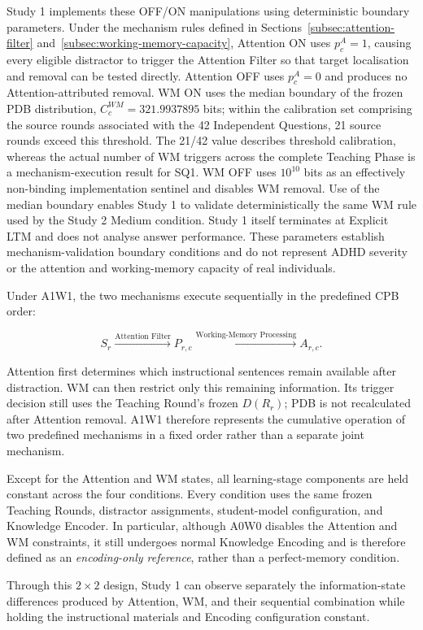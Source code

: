 Study 1 implements these OFF/ON manipulations using deterministic boundary parameters. Under the mechanism rules defined in Sections~\ref{subsec:attention-filter} and~\ref{subsec:working-memory-capacity}, Attention ON uses $p^A_c=1$, causing every eligible distractor to trigger the Attention Filter so that target localisation and removal can be tested directly. Attention OFF uses $p^A_c=0$ and produces no Attention-attributed removal. WM ON uses the median boundary of the frozen PDB distribution, $C^{WM}_c=321.9937895$ bits; within the calibration set comprising the source rounds associated with the 42 Independent Questions, 21 source rounds exceed this threshold. The 21/42 value describes threshold calibration, whereas the actual number of WM triggers across the complete Teaching Phase is a mechanism-execution result for SQ1. WM OFF uses $10^{10}$ bits as an effectively non-binding implementation sentinel and disables WM removal. Use of the median boundary enables Study 1 to validate deterministically the same WM rule used by the Study 2 Medium condition. Study 1 itself terminates at Explicit LTM and does not analyse answer performance. These parameters establish mechanism-validation boundary conditions and do not represent ADHD severity or the attention and working-memory capacity of real individuals.

Under A1W1, the two mechanisms execute sequentially in the predefined CPB order:

\[
S_r
\xrightarrow{\text{Attention Filter}}
P_{r,c}
\xrightarrow{\text{Working-Memory Processing}}
A_{r,c}.
\]

Attention first determines which instructional sentences remain available after distraction. WM can then restrict only this remaining information. Its trigger decision still uses the Teaching Round's frozen $D(R_r)$; PDB is not recalculated after Attention removal. A1W1 therefore represents the cumulative operation of two predefined mechanisms in a fixed order rather than a separate joint mechanism.

Except for the Attention and WM states, all learning-stage components are held constant across the four conditions. Every condition uses the same frozen Teaching Rounds, distractor assignments, student-model configuration, and Knowledge Encoder. In particular, although A0W0 disables the Attention and WM constraints, it still undergoes normal Knowledge Encoding and is therefore defined as an \textit{encoding-only reference}, rather than a perfect-memory condition.

Through this $2\times2$ design, Study 1 can observe separately the information-state differences produced by Attention, WM, and their sequential combination while holding the instructional materials and Encoding configuration constant.

